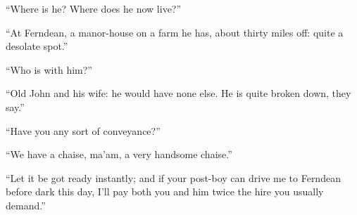 \enquote{Where is he? Where does he now live?}

\enquote{At Ferndean, a manor-house on a farm he has, about thirty miles
	off: quite a desolate spot.}

\enquote{Who is with him?}

\enquote{Old John and his wife: he would have none else. He is quite
	broken down, they say.}

\enquote{Have you any sort of conveyance?}

\enquote{We have a chaise, ma'am, a very handsome chaise.}

\enquote{Let it be got ready instantly; and if your post-boy can drive
	me to Ferndean before dark this day, I'll pay both you and him twice the
	hire you usually demand.}
